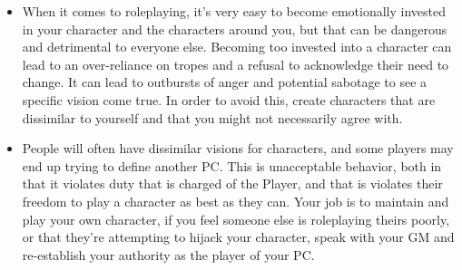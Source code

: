 \documentclass[../main.tex]{subfiles}
\begin{document}
    \begin{itemize}
        \item When it comes to roleplaying, it's very easy to become emotionally invested in your character and the characters around you, but that can be dangerous and detrimental to everyone else. Becoming too invested into a character can lead to an over-reliance on tropes and a refusal to acknowledge their need to change. It can lead to outbursts of anger and potential sabotage to see a specific vision come true. In order to avoid this, create characters that are dissimilar to yourself and that you might not necessarily agree with.
        
        \item People will often have dissimilar visions for characters, and some players may end up trying to define another PC. This is unacceptable behavior, both in that it violates duty that is charged of the Player, and that is violates their freedom to play a character as best as they can. Your job is to maintain and play your own character, if you feel someone else is roleplaying theirs poorly, or that they're attempting to hijack your character, speak with your GM and re-establish your authority as the player of your PC.
        
    \end{itemize}
\end{document}
